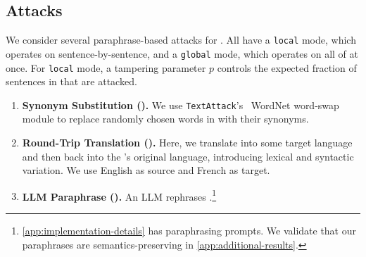 \subsection{Attacks}
\label{subsec:attacks}
We consider several paraphrase-based attacks for \attack. All have a \texttt{local} mode, which operates on \stegotext sentence-by-sentence, and a \texttt{global} mode, which operates on all of \stegotext at once. For \texttt{local} mode, a tampering parameter $p$ controls the expected fraction of sentences in \stegotext that are attacked.
\begin{enumerate}[itemsep=0pt, parsep=1pt]
\item \textbf{Synonym Substitution (\syn).} We use \texttt{TextAttack}'s~\cite{morris2020textattack} WordNet word-swap module to replace randomly chosen words in \stegotext with their synonyms.
\item \textbf{Round-Trip Translation (\rtt).} Here, we translate \stegotext into some target language and then back into the \stegotext's original language, introducing lexical and syntactic variation. We use English as source and French as target.
\item \textbf{LLM Paraphrase (\llmp).} An LLM rephrases \stegotext.\footnote{\autoref{app:implementation-details} has paraphrasing prompts. We validate that our paraphrases are semantics-preserving in \autoref{app:additional-results}.}
\end{enumerate}


